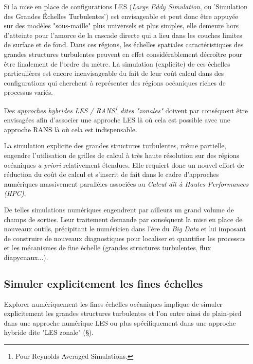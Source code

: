 Si la mise en place de configurations LES (\textit{Large Eddy Simulation}, ou 'Simulation des Grandes Échelles Turbulentes') est envisageable et peut donc être appuyée sur des modèles "sous-maille" plus universels et plus simples, elle demeure hors d’atteinte pour l'amorce de la cascade directe qui a lieu dans les couches limites de surface et de fond. Dans ces régions, les échelles spatiales caractéristiques des grandes structures turbulentes peuvent en effet considérablement décroître pour être finalement de l'ordre du mètre. La simulation (explicite) de ces échelles particulières est encore inenvisageable du fait de leur coût calcul dans des configurations qui cherchent à représenter des régions océaniques riches de processus variés. 

Des \textit{approches hybrides LES / RANS\footnote{Pour Reynolds Averaged Simulations.} dites "zonales"} \citep{friess_modelisation_2010} doivent par conséquent être envisagées afin d'associer une approche LES là où cela est possible avec une approche RANS là où cela est indispensable.

La simulation explicite des grandes structures turbulentes, même partielle, engendre l'utilisation de grilles de calcul à très haute résolution sur des régions océaniques \textit{a priori} relativement étendues. Elle requiert donc un nouvel effort de réduction du coût de calcul et s'inscrit de fait dans le cadre d'approches numériques massivement parallèles associées au \textit{Calcul dit à Hautes Performances (HPC)}.

De telles simulations numériques engendrent par ailleurs un grand volume de champs de sorties. Leur traitement demande par conséquent la mise en place de nouveaux outils, précipitant le numéricien dans l'ère du \textit{Big Data} et lui imposant de construire de nouveaux diagnostiques pour localiser et quantifier les processus et les mécanismes de fine échelle (grandes structures turbulentes, flux diapycnaux...).


\subsection{Simuler explicitement les fines échelles}

Explorer numériquement les fines échelles océaniques implique de simuler explicitement les grandes structures turbulentes et l'on entre ainsi de plain-pied dans une approche numérique LES ou plus spécifiquement dans une approche hybride dite "LES zonale" (\S {}).

